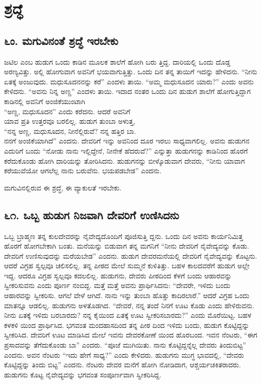 
\chapter{ಶ್ರದ್ಧೆ}

\section{\num{೬ಂ.} ಮಗುವಿನಂತೆ ಶ್ರದ್ಧೆ ಇರಬೇಕು}

ಜಟಿಲ ಎಂಬ ಹುಡುಗ ಒಂದು ಕಾಡಿನ ಮೂಲಕ ಶಾಲೆಗೆ ಹೋಗಿ ಬರು ತ್ತಿದ್ದ. ದಾರಿಯಲ್ಲಿ ಒಂದು ದೊಡ್ಡ ಅರಣ್ಯವಿತ್ತು. ಅಲ್ಲಿ ಹೋಗುವಾಗ ಅವನಿಗೆ ಭಯವಾಗುತ್ತಿತ್ತು. ಒಂದು ದಿನ ತನ್ನ ತಾಯಿಗೆ ಇದನ್ನು ಹೇಳಿದನು. “ನೀನು ಏತಕ್ಕೆ ಅಂಜುವುದು. ಮಧುಸೂದನನನ್ನು ಕರೆ” ಎಂದಳು ತಾಯಿ. “ಅಮ್ಮ ಮಧುಸೂದನ ಯಾರು?” ಎಂದು ಅವನು ಕೇಳಿದನು. “ಅವನು ನಿನ್ನ ಅಣ್ಣ” ಎಂದಳು ತಾಯಿ. ಇದಾದ ನಂತರ ಒಂದು ದಿನ ಹುಡುಗ ಶಾಲೆಗೆ ಹೋಗುತ್ತಿದ್ದಾಗ ಕಾಡಿನಲ್ಲಿ ಅವನಿಗೆ ಅಂಜಿಕೆಯುಂಟಾಗಿ\\“ಅಣ್ಣ, ಮಧುಸೂದನ” ಎಂದು ಕರೆದನು. ಆದರೆ ಅವನಿಗೆ\\ಯಾವ ಪ್ರತಿ ಉತ್ತರವೂ ಬರಲಿಲ್ಲ. ಹುಡುಗ ತುಂಬಾ ಅಳುತ್ತ,\\“ನನ್ನ ಅಣ್ಣ, ಮಧುಸೂದನ, ನೀನೆಲ್ಲಿರುವೆ? ನನ್ನ ಹತ್ತಿರ ಬಾ.\\ನನಗೆ ಅಂಜಿಕೆಯಾಗಿದೆ” ಎಂದನು. ದೇವರಿಗೆ ಇನ್ನು ಅವನಿಂದ ದೂರ ಇರಲು ಸಾಧ್ಯವಾಗಲಿಲ್ಲ. ಅವನು ಹುಡುಗನ ಎದುರಿಗೆ ಬಂದು “ನೋಡು ನಾನು ಇಲ್ಲಿದ್ದೇನೆ, ನೀನೇಕೆ ಹೆದರುವೆ?” ಎನ್ನುತ್ತಾ ಹುಡುಗನನ್ನು ಕಾಡಿನಿಂದ ಹೊರಗೆ ಕರೆದುಕೊಂಡು ಹೋಗಿ ದಾರಿಯನ್ನು ತೋರಿಸಿದನು. ಹುಡುಗನನ್ನು ಬೀಳ್ಕೊಡುವಾಗ ದೇವರು, “ನೀನು ಯಾವಾಗ ಕರೆಯುವೆಯೋ ಆಗಲೆಲ್ಲ ನಾನು ಬರುವೆನು. ಭಯಪಡಬೇಡ” ಎಂದನು.

ಮಗುವಿನಲ್ಲಿರುವ ಈ ಶ್ರದ್ಧೆ, ಈ ವ್ಯಾಕುಲತೆ ಇರಬೇಕು.


\section{\num{೬೧. } ಒಬ್ಬ ಹುಡುಗ ನಿಜವಾಗಿ ದೇವರಿಗೆ ಉಣಿಸಿದನು}

ಒಬ್ಬ ಬ್ರಾಹ್ಮಣ ತನ್ನ ಕುಲದೇವರನ್ನು ನೈವೇದ್ಯದೊಂದಿಗೆ ಪೂಜಿಸುತ್ತಿ ದ್ದನು. ಒಂದು ದಿನ ಅವನು ಕಾರ್ಯನಿಮಿತ್ತ ಹೊರಗೆ ಹೋಗಬೇಕಾಗಿ ಬಂತು. ಮನೆಯನ್ನು ಬಿಡುವಾಗ ತನ್ನ ಮಗನಿಗೆ “ನೀನು ದೇವರಿಗೆ ನೈವೇದ್ಯವನ್ನು ಕೊಡು. ದೇವರಿಗೆ ಉಣಿಸುವುದನ್ನು ಮರೆಯಬೇಡ” ಎಂದನು. ಹುಡುಗ ದೇವರಮನೆಯಲ್ಲಿ ದೇವರಿಗೆ ನೈವೇದ್ಯವನ್ನು ಕೊಟ್ಟನು. ಆದರೆ ವಿಗ್ರಹ ಸ್ವಲ್ಪವೂ ಚಲಿಸಲಿಲ್ಲ. ತನ್ನ ಪೀಠದ ಮೇಲೆ ಸುಮ್ಮನೆ ಕುಳಿತಿತ್ತು. ಬಹಳ ಕಾಲದವರೆಗೆ ಹುಡುಗ ಅಲ್ಲೇ ಇದ್ದ. ಆದರೂ ವಿಗ್ರಹ ಸ್ವಲ್ಪವೂ ಕದಲಲಿಲ್ಲ. ಹುಡುಗನು, ದೇವರು ಪೀಠದಿಂದ ಕೆಳಗೆ ಬಂದು ಆಹಾರವನ್ನು ಸ್ವೀಕರಿಸುವನು ಎಂದು ಪೂರ್ಣ ನಂಬಿದ್ದ. ಮತ್ತೆ ಮತ್ತೆ ಅವನು ಪ್ರಾರ್ಥಿಸಿದನು: “ದೇವರೇ, ಇಳಿದು ಬಂದು ಆಹಾರವನ್ನು ಸ್ವೀಕರಿಸು. ಆಗಲೆ ವೇಳೆ ಆಗಿದೆ. ನಾನು ಇನ್ನು ತುಂಬಾ ಹೊತ್ತು ಕಾದಿರಲಾರೆ.” ಆದರೆ ವಿಗ್ರಹ ಒಂದು ಮಾತನ್ನೂ ಆಡಲಿಲ್ಲ. ಹುಡುಗನು ಅಳತೊಡಗಿದ. “ದೇವರೆ, ನನ್ನ ತಂದೆ ನಿನಗೆ ಊಟ ಕೊಡು ಎಂದು ಹೇಳಿರುವನು. ನೀನು ಏತಕ್ಕೆ ಇಳಿದು ಬರಬಾರದು? ನನ್ನ ಕೈಯಿಂದ ಏತಕ್ಕೆ ಊಟ ಸ್ವೀಕರಿಸಬಾರದು?” ಎಂದು ಮೊರೆಯಿಟ್ಟ. ಬಹಳ ಕಳಕಳಿ ಯಿಂದ ಪ್ರಾರ್ಥಿಸಿದ. ಭಗವಂತ ಮಂದಹಾಸದಿಂದ ತನ್ನ ಪೀಠ ದಿಂದ ಇಳಿದು ಬಂದು, ಹುಡುಗ ಕೊಟ್ಟಿದ್ದನ್ನು ಸ್ವೀಕರಿಸಿದ. ದೇವರಿಗೆ ಊಟ ಮಾಡಿಸಿದ ಮೇಲೆ ಇವನು ದೇವರಕೋಣೆ ಯಿಂದ ಹೊರಬಂದ. ಇವನ ನೆಂಟರು, “ಈಗ ಪ್ರಸಾದವನ್ನು ತೆಗೆದುಕೊಂಡು ಬಾ” ಎಂದರು. “ಪೂಜೆ ಮುಗಿಯಿತು. ನಾನು ಕೊಟ್ಟಿದ್ದನ್ನೆಲ್ಲ ದೇವರು ತಿಂದುಬಿಟ್ಟ” ಎಂದನು. ಅವನ ನೆಂಟರು “ಇದು ಹೇಗೆ ಸಾಧ್ಯ?” ಎಂದು ಕೇಳಿದರು. ಹುಡುಗನು ಮುಗ್ಧ ಭಾವದಲ್ಲಿ, “ದೇವರು ಕೊಟ್ಟಿದ್ದನ್ನು ತಿಂದು ಬಿಟ್ಟ” ಎಂದನು. ನೆಂಟರು ದೇವರ ಮನೆಗೆ ಹೋಗಿ ನೋಡಿದಾಗ, ಆಶ್ಚರ್ಯಚಕಿತರಾದರು. ಹುಡುಗನು ಕೊಟ್ಟ ನೈವೇದ್ಯವನ್ನು ಭಗವಂತ ಸಂಪೂರ್ಣವಾಗಿ ಸ್ವೀಕರಿಸಿದ್ದ.


